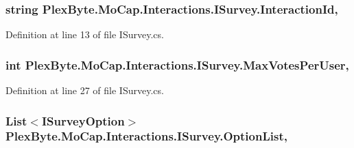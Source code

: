 \subsubsection[{\texorpdfstring{Interaction\+Id}{InteractionId}}]{\setlength{\rightskip}{0pt plus 5cm}string Plex\+Byte.\+Mo\+Cap.\+Interactions.\+I\+Survey.\+Interaction\+Id\hspace{0.3cm}{\ttfamily [get]}, {\ttfamily [set]}}\hypertarget{interface_plex_byte_1_1_mo_cap_1_1_interactions_1_1_i_survey_ad3a9fd1847c33d3204fa274ace8b9846}{}\label{interface_plex_byte_1_1_mo_cap_1_1_interactions_1_1_i_survey_ad3a9fd1847c33d3204fa274ace8b9846}


Definition at line 13 of file I\+Survey.\+cs.

\subsubsection[{\texorpdfstring{Max\+Votes\+Per\+User}{MaxVotesPerUser}}]{\setlength{\rightskip}{0pt plus 5cm}int Plex\+Byte.\+Mo\+Cap.\+Interactions.\+I\+Survey.\+Max\+Votes\+Per\+User\hspace{0.3cm}{\ttfamily [get]}, {\ttfamily [set]}}\hypertarget{interface_plex_byte_1_1_mo_cap_1_1_interactions_1_1_i_survey_a6518ebe3241906e81538e26e8df343c9}{}\label{interface_plex_byte_1_1_mo_cap_1_1_interactions_1_1_i_survey_a6518ebe3241906e81538e26e8df343c9}


Definition at line 27 of file I\+Survey.\+cs.

\subsubsection[{\texorpdfstring{Option\+List}{OptionList}}]{\setlength{\rightskip}{0pt plus 5cm}List$<${\bf I\+Survey\+Option}$>$ Plex\+Byte.\+Mo\+Cap.\+Interactions.\+I\+Survey.\+Option\+List\hspace{0.3cm}{\ttfamily [get]}, {\ttfamily [set]}}\hypertarget{interface_plex_byte_1_1_mo_cap_1_1_interactions_1_1_i_survey_aa346d9b90290f6d4871624d8ed2b848b}{}\label{interface_plex_byte_1_1_mo_cap_1_1_interactions_1_1_i_survey_aa346d9b90290f6d4871624d8ed2b848b}


